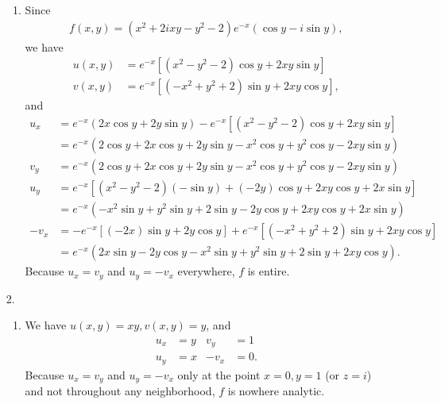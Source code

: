 \documentclass[a4paper,12pt]{article}
\begin{document}
\begin{enumerate}
\begin{enumerate}
            \item
                Since
                \begin{align*}
                    f(x, y) = (x^2 + 2ixy - y^2 - 2) e^{-x} (\cos y - i \sin y),
                \end{align*}
                we have
                \begin{align*}
                    u(x, y) &= e^{-x} [ (x^2 - y^2 - 2) \cos y + 2xy \sin y ] \\
                    v(x, y) &= e^{-x} [ (-x^2 + y^2 + 2) \sin y + 2xy \cos y ],
                \end{align*}
                and
                \begin{align*}
                    u_x &= e^{-x}(2x \cos y + 2y \sin y) - e^{-x} [ (x^2 - y^2 - 2) \cos y + 2xy \sin y ] \\
                    &= e^{-x}(2 \cos y + 2x \cos y + 2y \sin y - x^2 \cos y + y^2 \cos y - 2xy \sin y) \\
                    v_y &= e^{-x}(2 \cos y + 2x \cos y + 2y \sin y - x^2 \cos y + y^2 \cos y - 2xy \sin y) \\
                    u_y &= e^{-x} [ (x^2 - y^2 - 2)(-\sin y) + (-2y) \cos y + 2xy \cos y + 2x \sin y ] \\
                    &= e^{-x}(-x^2 \sin y + y^2 \sin y + 2 \sin y - 2y \cos y + 2xy \cos y + 2x \sin y) \\
                    -v_x &= -e^{-x} [(-2x) \sin y + 2y \cos y] + e^{-x} [ (-x^2 + y^2 + 2) \sin y + 2xy \cos y] \\
                    &= e^{-x}(2x \sin y - 2y \cos y - x^2 \sin y + y^2 \sin y + 2 \sin y + 2xy \cos y).
                \end{align*}
                Because $u_x = v_y$ and $u_y = -v_x$ everywhere, $f$ is entire.
        \end{enumerate}

    \item[2.]
        \begin{enumerate}
            \item
                We have $u(x, y) = xy, v(x, y) = y$, and
                \begin{align*}
                    u_x &= y &
                    v_y &= 1 \\
                    u_y &= x &
                    -v_x &= 0.
                \end{align*}
                Because $u_x = v_y$ and $u_y = -v_x$ only at the point $x = 0, y = 1$ (or $z = i$) and not throughout any neighborhood, $f$ is nowhere analytic.


\end{enumerate}
\end{enumerate}
\end{document}
